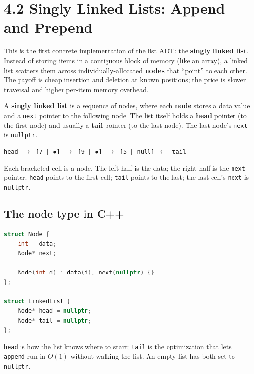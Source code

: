 \documentclass[11pt]{article}
\begin{document}
\section{4.2 Singly Linked Lists: Append and Prepend}

This is the first concrete implementation of the list ADT: the
\textbf{singly linked list}. Instead of storing items in a contiguous
block of memory (like an array), a linked list scatters them across
individually-allocated \textbf{nodes} that ``point'' to each other.
The payoff is cheap insertion and deletion at known positions; the
price is slower traversal and higher per-item memory overhead.

\begin{defnbox}
A \textbf{singly linked list} is a sequence of nodes, where each
\textbf{node} stores a data value and a \texttt{next} pointer to the
following node. The list itself holds a \textbf{head} pointer (to
the first node) and usually a \textbf{tail} pointer (to the last
node). The last node's \texttt{next} is \texttt{nullptr}.
\end{defnbox}

\begin{ideabox}
\texttt{head $\to$ [7 | $\bullet$] $\to$ [9 | $\bullet$] $\to$ [5 | null] $\leftarrow$ tail}

Each bracketed cell is a node. The left half is the data; the right
half is the \texttt{next} pointer. \texttt{head} points to the first
cell; \texttt{tail} points to the last; the last cell's \texttt{next}
is \texttt{nullptr}.
\end{ideabox}

\subsection{The node type in C++}

\begin{examplebox}
\begin{lstlisting}[basicstyle=\ttfamily\small,frame=single,language=C++]
struct Node {
    int   data;
    Node* next;

    Node(int d) : data(d), next(nullptr) {}
};

struct LinkedList {
    Node* head = nullptr;
    Node* tail = nullptr;
};
\end{lstlisting}
\texttt{head} is how the list knows where to start; \texttt{tail} is
the optimization that lets \texttt{append} run in $O(1)$ without
walking the list. An empty list has both set to \texttt{nullptr}.
\end{examplebox}
\end{document}
